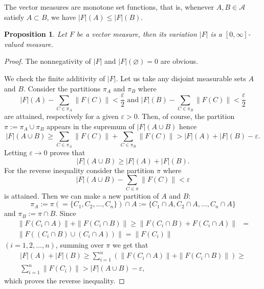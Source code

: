 \documentclass[a4paper, 12pt]{article}
\newtheorem{state}[lem]{Proposition}
\begin{document}
The vector measures are monotone set functions, that is, whenever $A, B \in \mathcal{A}$ satisfy $A \subset B$, we have $|F|(A) \leqslant |F|(B)$.

\begin{state}\label{prop:variation-measure}
Let $F$ be a vector measure, then its variation $|F|$ is a $[0, \infty]$-valued measure.
\end{state}
\begin{proof} The nonnegativity of $|F|$ and $|F|(\varnothing) = 0$ are obvious. 

We check the finite additivity of $|F|$. Let us take any disjoint measurable sets $A$ and $B$. Consider the partitions $\pi_A$ and $\pi_B$ where 
$$
|F|(A) - \sum_{C \in \pi_A}\|F(C)\| < \frac{\varepsilon}{2}\text{ and } |F|(B) - \sum_{C \in \pi_B}\|F(C)\| < \frac{\varepsilon}{2}
$$
are attained, respectively for a given $\varepsilon > 0$. Then, of course, the partition $\pi := \pi_A \cup \pi_B$ appears in the supremum of $|F|(A \cup B)$ hence 
$$
|F|(A \cup B) \geqslant \sum_{C \in \pi_A}\|F(C)\| + \sum_{C \in \pi_B}\|F(C)\| > |F|(A) + |F|(B) - \varepsilon.
$$
Letting $\varepsilon \to 0$ proves that
$$
|F|(A \cup B) \geqslant |F|(A) + |F|(B).
$$
For the reverse inequality consider the partition $\pi$ where 
$$
|F|(A \cup B) - \sum_{C \in \pi}\|F(C)\| < \varepsilon
$$
is attained. Then we can make a new partition of $A$ and $B$: 
$$
\pi_A := \pi ( = \lbrace C_1, C_2, \ldots,C_n \rbrace) \cap A := \lbrace C_1 \cap A, C_2 \cap A, \ldots, C_n \cap A \rbrace
$$ 
and $\pi_B := \pi \cap B$. Since
\begin{align*}
\|F(C_i \cap A) \| + \|F(C_i \cap B) \| \geqslant \| F(C_i \cap B) + F(C_i \cap A) \| &= \\
\| F((C_i \cap B) \cup (C_i \cap A)) \| = \| F(C_i) \|
\end{align*}
$(i=1,2,\ldots,n)$, summing over $\pi$ we get that
\begin{align*}
|F|(A) + |F|(B) \geqslant \sum^{n}_{i=1} \left(\|F(C_i \cap A) \| + \|F(C_i \cap B) \| \right) \geqslant \\ \sum^{n}_{i=1} \| F(C_i) \| > |F|(A \cup B) - \varepsilon,
\end{align*}
which proves the reverse inequality.


\end{proof}
\end{document}
